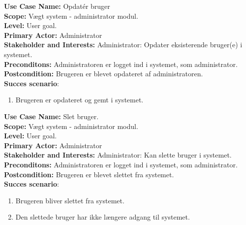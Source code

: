         \textbf{Use Case Name: } Opdatér bruger \\
        \textbf{Scope: } Vægt system - administrator modul. \\
        \textbf{Level: } User goal. \\
        \textbf{Primary Actor: } Administrator \\
        \textbf{Stakeholder and Interests: } Administrator: Opdater eksisterende bruger(e) i systemet. \\
        \textbf{Preconditons: }  Administratoren er logget ind i systemet, som administrator. \\
        \textbf{Postcondition: } Brugeren er blevet opdateret af administratoren. \\
        \textbf{Succes scenario}:
        \begin{enumerate}
            \item Brugeren er opdateret og gemt i systemet.
        \end{enumerate}

        \textbf{Use Case Name: } Slet bruger. \\
        \textbf{Scope: } Vægt system - administrator modul. \\
        \textbf{Level: } User goal. \\
        \textbf{Primary Actor: } Administrator \\
        \textbf{Stakeholder and Interests: } Administrator: Kan slette bruger i systemet. \\
        \textbf{Preconditons: }  Administratoren er logget ind i systemet, som administrator. \\
        \textbf{Postcondition: } Brugeren er blevet slettet fra systemet. \\
        \textbf{Succes scenario}:
        \begin{enumerate}
            \item Brugeren bliver slettet fra systemet.
            \item Den slettede bruger har ikke længere adgang til systemet. 
        \end{enumerate}